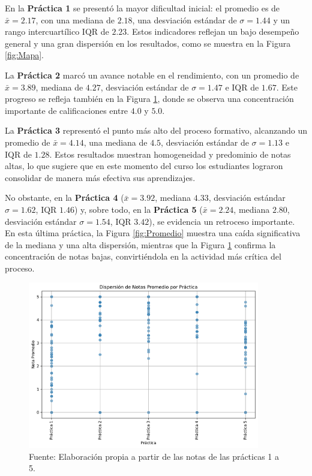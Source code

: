 \documentclass[letter,oneside,12pt,spanish]{report}
\begin{document}
En la \textbf{Práctica 1} se presentó la mayor dificultad inicial: el  promedio es de $\bar{x}=2.17$, con una mediana de $2.18$, una desviación estándar de $\sigma=1.44$ y un rango intercuartílico $\text{IQR}$ de $2.23$. Estos indicadores reflejan un bajo desempeño general y una gran dispersión en los resultados, como se muestra en la Figura \ref{fig:Mapa}.

La \textbf{Práctica 2} marcó un avance notable en el rendimiento, con un promedio de $\bar{x}=3.89$, mediana de $4.27$, desviación estándar de $\sigma=1.47$ e $\text{IQR}$ de $1.67$. Este progreso se refleja también en la Figura \ref{fig:Dispersion}, donde se observa una concentración importante de calificaciones entre $4.0$ y $5.0$.

La \textbf{Práctica 3} representó el punto más alto del proceso formativo, alcanzando un promedio de $\bar{x}=4.14$, una mediana de $4.5$, desviación estándar de $\sigma=1.13$ e $\text{IQR}$ de $1.28$. Estos resultados muestran homogeneidad y predominio de notas altas, lo que sugiere que en este momento del curso los estudiantes lograron consolidar de manera más efectiva sus aprendizajes.

No obstante, en la \textbf{Práctica 4} ($\bar{x}=3.92$, mediana $4.33$, desviación estándar $\sigma=1.62$, $\text{IQR}$ $1.46$) y, sobre todo, en la \textbf{Práctica 5} ($\bar{x}=2.24$, mediana $2.80$, desviación estándar $\sigma=1.54$, $\text{IQR}$ $3.42$), se evidencia un retroceso importante. En esta última práctica, la Figura \ref{fig:Promedio} muestra una caída significativa de la mediana y una alta dispersión, mientras que la Figura \ref{fig:Dispersion} confirma la concentración de notas bajas, convirtiéndola en la actividad más crítica del proceso.

\begin{figure}[ht]
	\centering
	\includegraphics[width=0.9\textwidth]{Figs/Dispersion_Notas.pdf}
	\label{fig:Dispersion}
	\\Fuente: Elaboración propia a partir de las notas de las prácticas 1 a 5.
\end{figure}
\end{document}
